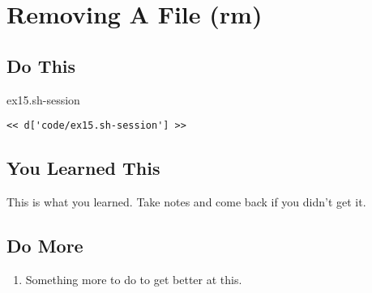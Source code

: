 \chapter{Removing A File (rm)}

\section{Do This}

\begin{code}{ex15.sh-session}
\begin{Verbatim}
<< d['code/ex15.sh-session'] >>
\end{Verbatim}
\end{code}


\section{You Learned This}

This is what you learned.  Take notes and come back if you didn't get it.

\section{Do More}

\begin{enumerate}
\item Something more to do to get better at this.
\end{enumerate}

